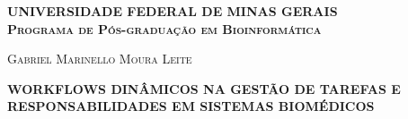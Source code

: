 \documentclass[12pt]{article}
\begin{document}
    \pagestyle{plain}
    \begin{titlepage}

        \center \textsc{\fontsize{14}{12}\selectfont \textbf{UNIVERSIDADE FEDERAL DE MINAS GERAIS}} \\
        \center \textsc{\fontsize{14}{12}\selectfont \textbf{Programa de Pós-graduação
em Bioinformática}}

        \vspace*{4cm}

        \newcommand{\HRule}{\rule{\linewidth}{0.5mm}}
        \textsc{\fontsize{14}{12}\selectfont 
        Gabriel Marinello Moura Leite}\\[0.2cm] 

        \vspace*{2cm}

        \textsc{\fontsize{16}{12}\selectfont \textbf{
        WORKFLOWS DINÂMICOS NA GESTÃO DE TAREFAS E\\RESPONSABILIDADES EM SISTEMAS BIOMÉDICOS}}\\[0.2cm] 

        \vspace*{\fill}
        
        
    \end{titlepage}
    \newpage
\end{document}

